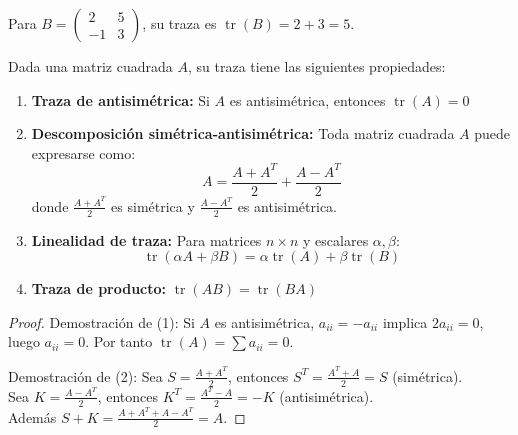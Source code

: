 \begin{example} Para $B = \begin{pmatrix} 2 & 5 \\ -1 & 3 \end{pmatrix}$, su traza es $\operatorname{tr}(B) = 2 + 3 = 5$.
\end{example}

\begin{theorem}\label{thm:proptraza} Dada una matriz cuadrada $A$, su traza tiene las siguientes propiedades:
\begin{enumerate}
\item \textbf{Traza de antisimétrica:} Si $A$ es antisimétrica, entonces $\operatorname{tr}(A) = 0$
  
\item \textbf{Descomposición simétrica-antisimétrica:} Toda matriz cuadrada $A$ puede expresarse como:
\[
A = \frac{A + A^T}{2} + \frac{A - A^T}{2}
\]
donde $\frac{A + A^T}{2}$ es simétrica y $\frac{A - A^T}{2}$ es antisimétrica.

\item \textbf{Linealidad de traza:} Para matrices $n\times n$ y escalares $\alpha,\beta$:
\[
\operatorname{tr}(\alpha A + \beta B) = \alpha \operatorname{tr}(A) + \beta \operatorname{tr}(B)
\]

\item \textbf{Traza de producto:} $\operatorname{tr}(AB) = \operatorname{tr}(BA)$
\end{enumerate}
\end{theorem}

\begin{proof}
Demostración de (1): Si $A$ es antisimétrica, $a_{ii} = -a_{ii}$ implica $2a_{ii}=0$, luego $a_{ii}=0$. Por tanto $\operatorname{tr}(A) = \sum a_{ii} = 0$.

Demostración de (2): Sea $S = \frac{A + A^T}{2}$, entonces $S^T = \frac{A^T + A}{2} = S$ (simétrica). \\
Sea $K = \frac{A - A^T}{2}$, entonces $K^T = \frac{A^T - A}{2} = -K$ (antisimétrica). \\
Además $S + K = \frac{A + A^T + A - A^T}{2} = A$.
\end{proof}


